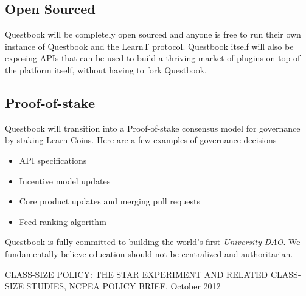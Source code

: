 \documentclass{article}
\begin{document}
    \subsection{Open Sourced}
      Questbook will be completely open sourced and anyone is free to run their own instance of Questbook and the LearnT protocol.
      Questbook itself will also be exposing APIs that can be used to build a thriving market of plugins on top of the platform itself, without having to fork Questbook.

    \subsection{Proof-of-stake}
      Questbook will transition into a Proof-of-stake consensus model for governance by staking Learn Coins.
      Here are a few examples of governance decisions 
      \begin{itemize}
        \item API specifications
        \item Incentive model updates
        \item Core product updates and merging pull requests
        \item Feed ranking algorithm 
      \end{itemize}

    Questbook is fully committed to building the world's first \textit{University DAO}.
    We fundamentally believe education should not be centralized and authoritarian.

  \begin{thebibliography}{9}
     CLASS-SIZE POLICY: THE STAR EXPERIMENT AND RELATED CLASS-SIZE STUDIES, NCPEA	POLICY	BRIEF, October 2012
  \end{thebibliography}
\end{document}
